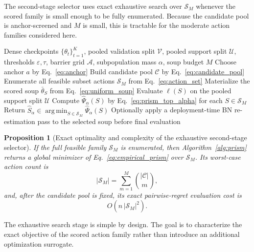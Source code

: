 \documentclass{article}
\newtheorem{proposition}{Proposition}
\newcommand{\cA}{\mathcal{A}}
\newcommand{\cC}{\mathcal{C}}
\newcommand{\cS}{\mathcal{S}}
\newcommand{\cU}{\mathcal{U}}
\newcommand{\cV}{\mathcal{V}}
\newcommand{\argmin}{\operatorname*{arg\,min}}
\newcommand{\prism}{\textup{\textsc{PRISM}}}
\newcommand{\loss}{\ell}
\newcommand{\1}{\mathbbm{1}}
\begin{document}
The second-stage selector uses exact exhaustive search over \(\cS_M\) whenever the scored family is small enough to be fully enumerated. Because the candidate pool is anchor-screened and \(M\) is small, this is tractable for the moderate action families considered here.

\begin{algorithm}[t]
\caption{\prism{} exact post-hoc selector}
\label{alg:prism}
\begin{algorithmic}[1]
\Require Dense checkpoints \(\{\theta_t\}_{t=1}^{K}\), pooled validation split \(\cV\), pooled support split \(\cU\), thresholds \(\varepsilon,\tau\), barrier grid \(\cA\), subpopulation mass \(\alpha\), soup budget \(M\)
\State Choose anchor \(a\) by Eq.~\eqref{eq:anchor}
\State Build candidate pool \(\cC\) by Eq.~\eqref{eq:candidate_pool}
\State Enumerate all feasible subset actions \(\cS_M\) from Eq.~\eqref{eq:action_set}
\For{each \(S\in\cS_M\)}
    \State Materialize the scored soup \(\bar{\theta}_S\) from Eq.~\eqref{eq:uniform_soup}
    \State Evaluate \(\loss(S)\) on the pooled support split \(\cU\)
\EndFor
\State Compute \(\widehat{\Psi}_\alpha(S)\) by Eq.~\eqref{eq:prism_top_alpha} for each \(S\in\cS_M\)
    \State Return \(\widehat{S}_\alpha \in \argmin_{S\in\cS_M}\widehat{\Psi}_\alpha(S)\)
    \State Optionally apply a deployment-time BN re-estimation pass to the selected soup before final evaluation
\end{algorithmic}
\end{algorithm}

\begin{proposition}[Exact optimality and complexity of the exhaustive second-stage selector]
\label{prop:global_optimality}
If the full feasible family \(\cS_M\) is enumerated, then Algorithm~\ref{alg:prism} returns a global minimizer of Eq.~\eqref{eq:empirical_prism} over \(\cS_M\). Its worst-case action count is
\begin{equation}
    |\cS_M|
    =
    \sum_{m=1}^{M} \binom{|\cC|}{m},
    \label{eq:action_count}
\end{equation}
and, after the candidate pool is fixed, its exact pairwise-regret evaluation cost is
\begin{equation}
    O\!\left(
        n \, |\cS_M|^2
    \right).
    \label{eq:selector_complexity}
\end{equation}
\end{proposition}

The exhaustive search stage is simple by design. The goal is to characterize the exact objective of the scored action family rather than introduce an additional optimization surrogate.
\end{document}
